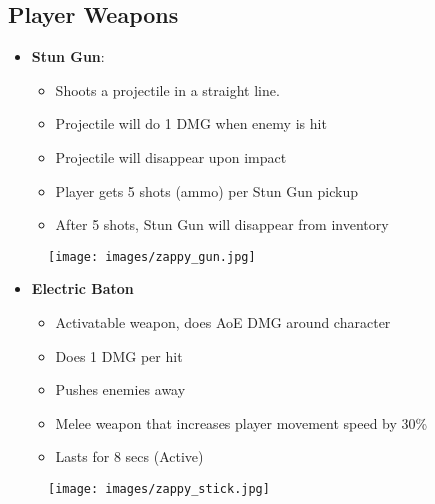 \documentclass[10pt]{report}
\begin{document}
\subsection{Player Weapons}

\begin{minipage}{.8\linewidth}
    \begin{itemize}
        \item \textbf{Stun Gun}:
        \begin{itemize}
            \item Shoots a projectile in a straight line.
            \item Projectile will do 1 DMG when enemy is hit 
            \item Projectile will disappear upon impact
            \item Player gets 5 shots (ammo) per Stun Gun pickup
            \item After 5 shots, Stun Gun will disappear from inventory
        \end{itemize}
    \end{itemize}
\end{minipage} \hfill
\begin{minipage}{.18\linewidth}
    \begin{figure}[H]
        \centering
        \texttt{[image: images/zappy\_gun.jpg]}
        \caption{}
    \end{figure}
\end{minipage}

\begin{minipage}{.8\linewidth}
    \begin{itemize}
        \item \textbf{Electric Baton}
        \begin{itemize}
            \item Activatable weapon, does AoE DMG around character
            \item Does 1 DMG per hit
            \item Pushes enemies away
            \item Melee weapon that increases player movement speed by 30\%
            \item Lasts for 8 secs (Active)
        \end{itemize}
    \end{itemize}
\end{minipage} \hfill
\begin{minipage}{.18\linewidth}
    \begin{figure}[H]
        \centering
        \texttt{[image: images/zappy\_stick.jpg]}
        \caption{}
    \end{figure}
\end{minipage}
    
\end{document}
